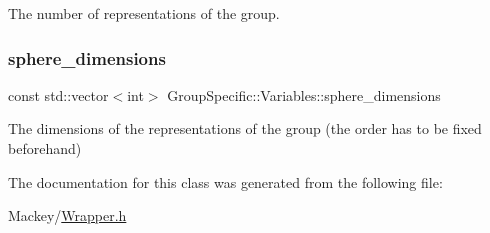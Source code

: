 The number of representations of the group. 

\mbox{\label{classGroupSpecific_1_1Variables_a4746f16736abcf4c705dd8690ec12ca0}} 
\subsubsection{\texorpdfstring{sphere\+\_\+dimensions}{sphere\_dimensions}}
{\footnotesize\ttfamily const std\+::vector$<$int$>$ Group\+Specific\+::\+Variables\+::sphere\+\_\+dimensions\hspace{0.3cm}{\ttfamily [static]}}



The dimensions of the representations of the group (the order has to be fixed beforehand) 



The documentation for this class was generated from the following file\+:\begin{DoxyCompactItemize}
\item 
Mackey/\hyperlink{Wrapper_8h}{Wrapper.\+h}\end{DoxyCompactItemize}
